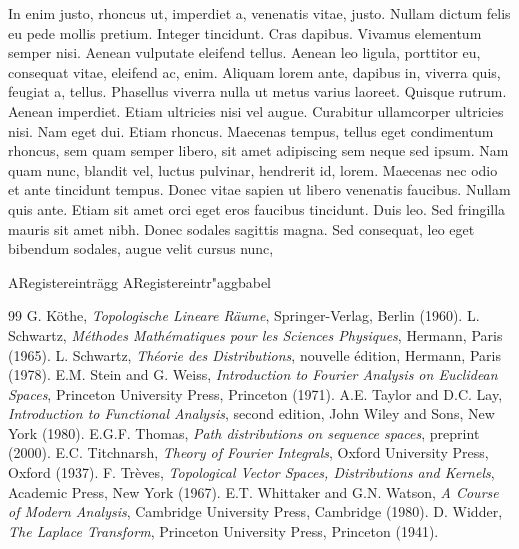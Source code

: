 \documentclass[english,ngerman]{book}%
\theoremstyle{dgdef}
\theoremstyle{dgthm}
\begin{document}
In enim justo, rhoncus ut, imperdiet a, venenatis vitae, justo. Nullam dictum felis eu pede mollis pretium. Integer tincidunt. Cras dapibus. Vivamus elementum semper nisi. Aenean vulputate eleifend tellus. Aenean leo ligula, porttitor eu, consequat vitae, eleifend ac, enim. Aliquam lorem ante, dapibus in, viverra quis, feugiat a, tellus. Phasellus viverra nulla ut metus varius laoreet. Quisque rutrum. Aenean imperdiet. Etiam ultricies nisi vel augue. Curabitur ullamcorper ultricies nisi. Nam eget dui. Etiam rhoncus. Maecenas tempus, tellus eget condimentum rhoncus, sem quam semper libero, sit amet adipiscing sem neque sed ipsum. Nam quam nunc, blandit vel, luctus pulvinar, hendrerit id, lorem. Maecenas nec odio et ante tincidunt tempus. Donec vitae sapien ut libero venenatis faucibus. Nullam quis ante. Etiam sit amet orci eget eros faucibus tincidunt. Duis leo. Sed fringilla mauris sit amet nibh. Donec sodales sagittis magna. Sed consequat, leo eget bibendum sodales, augue velit cursus nunc,




 ARegistereintr\"agg
 ARegistereintr"aggbabel

\backmatter

\begin{thebibliography}{99}%
 G. K\"othe, \emph{Topologische Lineare R\"aume}, Springer-Verlag, Berlin  (1960).
 L. Schwartz, \emph{M\'ethodes Math\'ematiques pour les Sciences Physiques}, Hermann, Paris (1965).
 L. Schwartz, \emph{Th\'eorie des Distributions}, nouvelle \'edition, Hermann, Paris (1978).
  E.M. Stein and G. Weiss, \emph{Introduction to Fourier Analysis on Euclidean Spaces}, Princeton University Press, Princeton (1971).
 A.E. Taylor and D.C. Lay, \emph{Introduction to Functional Analysis}, second edition, John Wiley and Sons, New York (1980).
 E.G.F. Thomas, \emph{Path distributions on sequence spaces}, preprint (2000).
E.C. Titchnarsh, \emph{Theory of Fourier Integrals}, Oxford University Press, Oxford (1937).
 F. Tr\`eves, \emph{Topological Vector Spaces, Distributions and Kernels}, Academic Press, New York (1967).
 E.T. Whittaker and G.N. Watson, \emph{A Course of Modern Analysis}, Cambridge University Press, Cambridge (1980).
 D. Widder, \emph{The Laplace Transform}, Princeton University Press, Princeton (1941).
\end{thebibliography}
\end{document}
